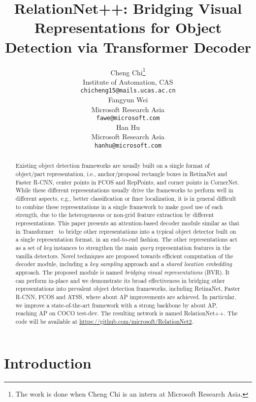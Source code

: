 \documentclass{article}
\title{RelationNet++: Bridging Visual Representations for Object Detection via Transformer Decoder}
\author{Cheng Chi\thanks{The work is done when Cheng Chi is an intern at Microsoft Research Asia.}\\
  Institute of Automation, CAS\\
  \texttt{chicheng15@mails.ucas.ac.cn}  \\
\And
Fangyun Wei \\
Microsoft Research Asia \\
\texttt{fawe@microsoft.com} \\
\And
Han Hu \\
Microsoft Research Asia \\
\texttt{hanhu@microsoft.com} \\
}
\begin{document}
\maketitle

\begin{abstract}
Existing object detection frameworks are usually built on a single format of object/part representation, i.e., anchor/proposal rectangle boxes in RetinaNet and Faster R-CNN, center points in FCOS and RepPoints, and corner points in CornerNet. While these different representations usually drive the frameworks to perform well in different aspects, e.g., better classification or finer localization, it is in general difficult to combine these representations in a single framework to make good use of each strength, due to the heterogeneous or non-grid feature extraction by different representations. This paper presents an attention-based decoder module similar as that in Transformer~\cite{vaswani2017attention} to bridge other representations into a typical object detector built on a single representation format, in an end-to-end fashion. The other representations act as a set of \emph{key} instances to strengthen the main \emph{query} representation features in the vanilla detectors. Novel techniques are proposed towards efficient computation of the decoder module, including a \emph{key sampling} approach and a \emph{shared location embedding} approach. The proposed module is named \emph{bridging visual representations} (BVR). It can perform in-place and we demonstrate its broad effectiveness in bridging other representations into prevalent object detection frameworks, including RetinaNet, Faster R-CNN, FCOS and ATSS, where about  AP improvements are achieved. In particular, we improve a state-of-the-art framework with a strong backbone by about  AP, reaching  AP on COCO test-dev. The resulting network is named RelationNet++. The code will be available at \url{https://github.com/microsoft/RelationNet2}.
\end{abstract}

\vspace{-.5em}

\section{Introduction}
\end{document}
